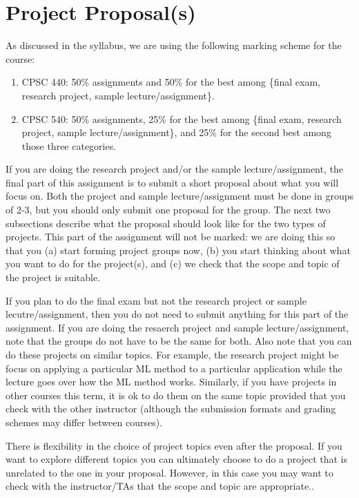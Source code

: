 \documentclass{article}
\def\blu#1{{\color{blu}#1}}
\def\enum#1{\begin{enumerate}#1\end{enumerate}}
\begin{document}
\section*{Project Proposal(s)}

As discussed in the syllabus, we are using the following marking scheme for the course:
\enum{
\item CPSC 440: 50\% assignments and 50\% for the best among \{final exam, research project, sample lecture/assignment\}.
\item CPSC 540: 50\% assignments, 25\% for the best among \{final exam, research project, sample lecture/assignment\}, and 25\% for the second best among those three categories.
}

If you are doing the research project and/or the sample lecture/assignment, \blu{the final part of this assignment is to submit a short proposal about what you will focus on}. Both the project and sample lecture/assignment must be done in groups of 2-3, but you should only submit one proposal for the group. The next two subsections describe what the proposal should look like for the two types of projects. This part of the assignment will not be marked: we are doing this so that you (a) start forming project groups now, (b) you start thinking about what you want to do for the project(s), and (c) we check that the scope and topic of the project is suitable.

If you plan to do the final exam but not the research project or sample lecutre/assignment, then you do not need to submit anything for this part of the assignment. If you are doing the resaerch project and sample lecture/assignment, note that the groups do not have to be the same for both. Also note that you can do these projects on similar topics. For example, the research project might be focus on applying a particular ML method to a particular application while the lecture goes over how the ML method works. Similarly, if you have projects in other courses this term, it is ok to do them on the same topic provided that you check with the other instructor (although the submission formats and grading schemes may differ between courses).

There is flexibility in the choice of project topics even after the proposal. If you want to explore different topics you can ultimately choose to do a project that is unrelated to the one in your proposal. However, in this case you may want to check with the instructor/TAs that the scope and topic are appropriate..
\end{document}
